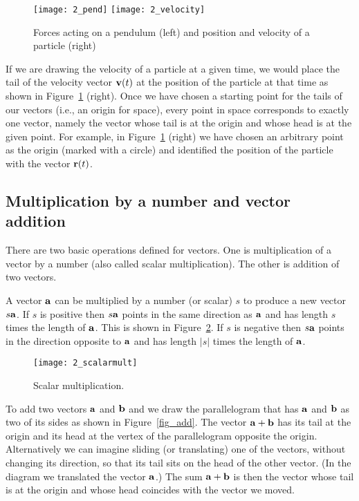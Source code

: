 \begin{figure}
\centerline{\texttt{[image: 2\_pend]}
\texttt{[image: 2\_velocity]}}
\caption{Forces acting on a pendulum (left) and 
position and velocity of a particle (right) \label{fig_pend}}
\end{figure}

If we are drawing the velocity of a particle at a given time, we would
place the tail of the velocity vector ${\bf v}(t)$ at the position of
the particle at that time as shown in Figure~\ref{fig_pend} (right). 
Once we have chosen a starting point for the tails of our vectors
(i.e., an origin for space), every point in space corresponds to
exactly one vector, namely the vector whose tail is at the origin and
whose head is at the given point. For example, in Figure~\ref{fig_pend} 
(right)
we have chosen an arbitrary point as the origin (marked with a circle)
and identified the position of the particle with the vector ${\bf
r}(t)$.

\subsection{Multiplication by a number and vector addition}

There are two basic operations defined for vectors. One is
multiplication of a vector by a number (also called scalar
multiplication). The other is addition of two vectors.

A vector $\aa$ can be multiplied by a number (or scalar) $s$ to
produce a new vector $s\aa$. If $s$ is positive then $s\aa$ points in
the same direction as $\aa$ and has length $s$ times the length of
$\aa$. This is shown in Figure~\ref{fig_scalarmult}.
If $s$ is negative then $s\aa$ points in the direction opposite
to $\aa$ and has length $|s|$ times the length of $\aa$.

\begin{figure}
\centerline{\texttt{[image: 2\_scalarmult]}}
\caption{Scalar multiplication. \label{fig_scalarmult}}
\end{figure}

To add two vectors $\aa$ and $\bb$ and we draw the parallelogram that
has $\aa$ and $\bb$ as two of its sides as shown in Figure~\ref{fig_add}. 
The vector $\aa + \bb$ has
its tail at the origin and its head at the vertex of the parallelogram
opposite the origin. Alternatively we can imagine sliding (or
translating) one of the vectors, without changing its direction, so
that its tail sits on the head of the other vector. (In the diagram we
translated the vector $\aa$.) The sum $\aa + \bb$ is then the vector
whose tail is at the origin and whose head coincides with the vector
we moved.

